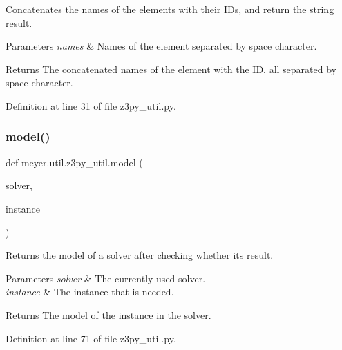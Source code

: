Concatenates the names of the elements with their I\+Ds, and return the string result. 


\begin{DoxyParams}{Parameters}
{\em names} & Names of the element separated by space character. \\
\hline
\end{DoxyParams}
\begin{DoxyReturn}{Returns}
The concatenated names of the element with the ID, all separated by space character. 
\end{DoxyReturn}


Definition at line 31 of file z3py\+\_\+util.\+py.

\mbox{\label{namespacemeyer_1_1util_1_1z3py__util_a8512b24ebe7ccd137b53ba52407415fb}} 
\subsubsection{\texorpdfstring{model()}{model()}}
{\footnotesize\ttfamily def meyer.\+util.\+z3py\+\_\+util.\+model (\begin{DoxyParamCaption}\item[{}]{solver,  }\item[{}]{instance }\end{DoxyParamCaption})}



Returns the model of a solver after checking whether its result. 


\begin{DoxyParams}{Parameters}
{\em solver} & The currently used solver. \\
\hline
{\em instance} & The instance that is needed. \\
\hline
\end{DoxyParams}
\begin{DoxyReturn}{Returns}
The model of the instance in the solver. 
\end{DoxyReturn}


Definition at line 71 of file z3py\+\_\+util.\+py.

\mbox{\label{namespacemeyer_1_1util_1_1z3py__util_a6d3bdd5583300633c2b4562123a3e876}} 
